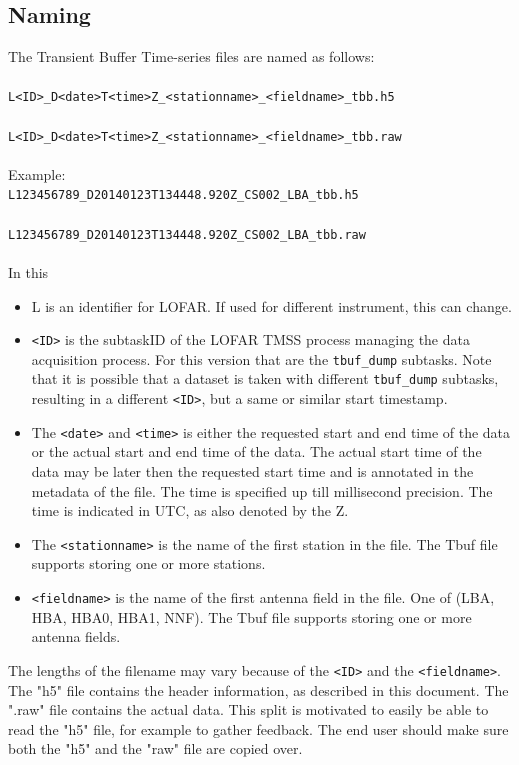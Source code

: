 \documentclass[a4paper,10pt,bibtotoc]{scrartcl}
\begin{document}


\subsection{Naming}
The Transient Buffer Time-series files are named as follows:\\\,\\
\verb|L<ID>_D<date>T<time>Z_<stationname>_<fieldname>_tbb.h5|\\\,\\
\verb|L<ID>_D<date>T<time>Z_<stationname>_<fieldname>_tbb.raw|\\\,\\
Example:\\
\verb|L123456789_D20140123T134448.920Z_CS002_LBA_tbb.h5|\\\,\\
\verb|L123456789_D20140123T134448.920Z_CS002_LBA_tbb.raw|\\\,\\

In this 
\begin{itemize}
    \item L is an identifier for LOFAR. If used for different instrument, this can change.
    \item \verb|<ID>| is the subtaskID of the LOFAR TMSS process managing the data acquisition process. For this version that are the \verb|tbuf_dump| subtasks. Note that it is possible that a dataset is taken with different \verb|tbuf_dump| subtasks, resulting in a different \verb|<ID>|, but a same or similar start timestamp.
    \item The \verb|<date>| and \verb|<time>| is either the requested start and end time of the data or the actual start and end time of the data. The actual start time of the data may be later then the requested start time and is annotated in the metadata of the file. The time is specified up till millisecond precision. The time is indicated in UTC, as also denoted by the Z.
    \item The \verb|<stationname>| is the name of the first station in the file. The Tbuf file supports storing one or more stations.
    \item \verb|<fieldname>| is the name of the first antenna field in the file. One of (LBA, HBA, HBA0, HBA1, NNF).  The Tbuf file supports storing one or more antenna fields.
\end{itemize} 
The lengths of the filename may vary because of the \verb|<ID>| and the \verb|<fieldname>|. The "h5" file contains the header information, as described in this document. The ".raw" file contains the actual data. This split is motivated to easily be able to read the "h5" file, for example to gather feedback. The end user should make sure both the "h5" and the "raw" file are copied over. 
\end{document}
